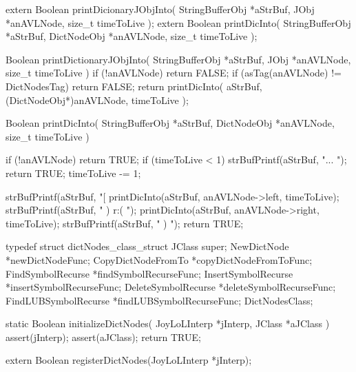 \startCHeader
extern Boolean printDicionaryJObjInto(
  StringBufferObj *aStrBuf,
  JObj            *anAVLNode,
  size_t           timeToLive
);
extern Boolean printDicInto(
  StringBufferObj *aStrBuf,
  DictNodeObj     *anAVLNode,
  size_t           timeToLive
);
\stopCHeader
{}

\startCCode
Boolean printDictionaryJObjInto(
  StringBufferObj *aStrBuf,
  JObj            *anAVLNode,
  size_t           timeToLive
) {
  if (!anAVLNode) return FALSE;
  if (asTag(anAVLNode) != DictNodesTag) return FALSE;
  return printDicInto(
    aStrBuf,
    (DictNodeObj*)anAVLNode,
    timeToLive
  );
}

Boolean printDicInto(
  StringBufferObj *aStrBuf,
  DictNodeObj     *anAVLNode,
  size_t           timeToLive
) {
  if (!anAVLNode) return TRUE;
  if (timeToLive < 1) {
    strBufPrintf(aStrBuf, "... ");
    return TRUE;
  }
  timeToLive -= 1;
  
  strBufPrintf(aStrBuf, "[%
  printDicInto(aStrBuf, anAVLNode->left, timeToLive);
  strBufPrintf(aStrBuf, " ) r:( ");
  printDicInto(aStrBuf, anAVLNode->right, timeToLive);
  strBufPrintf(aStrBuf, " ) ");
  return TRUE;
}
\stopCCode

\startTestSuite[registerDictNodes]

\startCHeader
typedef struct dictNodes_class_struct {
  JClass super;
  NewDictNode          *newDictNodeFunc;
  CopyDictNodeFromTo   *copyDictNodeFromToFunc;
  FindSymbolRecurse    *findSymbolRecurseFunc;
  InsertSymbolRecurse  *insertSymbolRecurseFunc;
  DeleteSymbolRecurse  *deleteSymbolRecurseFunc;
  FindLUBSymbolRecurse *findLUBSymbolRecurseFunc;
} DictNodesClass;
\stopCHeader

\startCCode
static Boolean initializeDictNodes(
  JoyLoLInterp *jInterp,
  JClass   *aJClass
) {
  assert(jInterp);
  assert(aJClass);
  return TRUE;
}
\stopCCode

\startCHeader
extern Boolean registerDictNodes(JoyLoLInterp *jInterp);
\stopCHeader
{}

